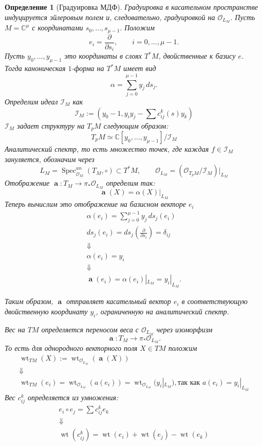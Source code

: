 \documentclass[a4paper, 10pt]{article}
\theoremstyle{plain}
\newtheorem{defin}{Определение}
\newcommand{\defeq}{:=}
\begin{document}
\begin{defin}[Градуировка МДФ]
Градуировка в касательном пространстве индуцируется эйлеровым полем и, следовательно, градуировкой на \(\mathcal{O}_{L_M}\).
Пусть \(M=\mathbb C^\mu\) с координатами \(s_0,\ldots,s_{\mu-1}.\)
Положим
\[
e_i=\frac{\partial}{\partial s_i},
\qquad i=0,\ldots,\mu-1.
\]
Пусть \( y_0,\ldots,y_{\mu-1}\) это координаты в слоях \(T^*M\), двойственные к базису \(e\). Тогда каноническая \(1\)-форма на \(T^*M\) имеет вид
\[
\alpha=\sum_{j=0}^{\mu-1}y_j\,ds_j.
\]
Определим идеал \(\mathcal{I}_M\) как \[\mathcal{I}_M \defeq \left(y_0 - 1, y_iy_j - \sum c_{ij}^k(s)y_k\right)\]
\(\mathcal{I}_M\) задает структуру на \(T_pM\) следующим образом:\[T_pM \simeq \mathbb{C}[y_0, \dots, y_{\mu-1}]\Big/\mathcal{I}_M\]
Аналитический спектр, то есть множество точек, где каждая \(f \in \mathcal{I}_M\) зануляется, обозначим через
\[
L_M=\operatorname{Spec}^{an}_{\mathcal O_M}(T_M,\circ)\subset T^*M, \qquad \mathcal{O}_{L_M} = \left(\mathcal{O}_{T_pM}\Big/\mathcal{I}_M\right)\Big|_{L_M}
\]
Отображение \(\boldsymbol{\operatorname{a}}:T_M \rightarrow \pi_*\mathcal{O}_{L_M}\) определим так:
\[\boldsymbol{\operatorname{a}}(X)=\alpha(X)|_{L_M}\]
Теперь вычислим это отображение на базисном векторе \(e_i\)
\begin{gather*}
    \alpha(e_i) = \sum_{j=0}^{\mu-1}y_j\,ds_j(e_i)\\
    ds_j(e_i) = ds_j\left(\frac{\partial}{\partial s_i}\right) = \delta_{ij}\\
    \Downarrow\\
    \alpha(e_i)=y_i\\
    \Downarrow\\
    \boldsymbol{\operatorname{a}}(e_i)=\alpha(e_i)|_{L_M}=y_i|_{L_M}.
\end{gather*}

Таким образом, \(\boldsymbol{\operatorname{a}}\) отправляет касательный вектор \(e_i\) в соответствующую двойственную координату \(y_i\), ограниченную на аналитический спектр.


Вес на \(TM\) определяется переносом веса с
\(\mathcal O_{L_M}\) через изоморфизм
\[\boldsymbol{\operatorname{a}}:T_M\longrightarrow \pi_*\mathcal O_{L_M}.\]
То есть для однородного векторного поля \(X\in TM\) положим
\begin{gather*}
\operatorname{wt}_{TM}(X)\defeq \operatorname{wt}_{\mathcal O_{L_M}}(\boldsymbol{\operatorname{a}}(X))\\
\Downarrow\\
\operatorname{wt}_{TM}(e_i) = \operatorname{wt}_{\mathcal{O}_{L_M}}(a(e_i)) = \operatorname{wt}_{\mathcal{O}_{L_M}}(y_i|_{L_M}), \text{так как } a(e_i)=y_i|_{L_M}
\end{gather*}
Вес \(c_{ij}^k\) определяется из умножения:
\begin{gather*}e_i\circ e_j = \sum c^k_{ij} e_k \\
\Downarrow\\
\operatorname{wt}(c^k_{ij}) = \operatorname{wt}(e_i) + \operatorname{wt}(e_j) - \operatorname{wt}(e_k)\end{gather*}
\end{defin}
\end{document}
